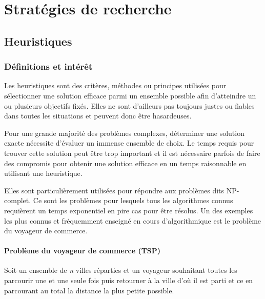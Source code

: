 \chapter{Stratégies de recherche} %

\label{Chapter1} %



\section{Heuristiques}

\subsection{Définitions et intérêt}
Les heuristiques sont des critères, méthodes ou principes utilisées pour sélectionner une solution efficace parmi un ensemble possible afin d'atteindre un ou plusieurs objectifs fixés\cite{judea-pearl-heuristics}.
Elles ne sont d'ailleurs pas toujours justes ou fiables dans toutes les situations et peuvent donc être hasardeuses.

Pour une grande majorité des problèmes complexes, déterminer une solution exacte nécessite d'évaluer un immense ensemble de choix. Le temps requis pour trouver cette solution peut être trop important et il est nécessaire parfois de faire des compromis pour obtenir une solution efficace en un temps raisonnable en utilisant une heuristique. 

Elles sont particulièrement utilisées pour répondre aux problèmes dits NP-complet. Ce sont les problèmes pour lesquels tous les algorithmes connus requièrent un temps exponentiel en pire cas pour être résolus. 
Un des exemples les plus connus et fréquemment enseigné en cours d'algorithmique est le problème du voyageur de commerce.

\subsubsection{Problème du voyageur de commerce (TSP)}
Soit un ensemble de \textit{n} villes réparties et un voyageur souhaitant toutes les parcourir une et une seule fois puis retourner à la ville d'où il est parti et ce en parcourant au total la distance la plus petite possible.

